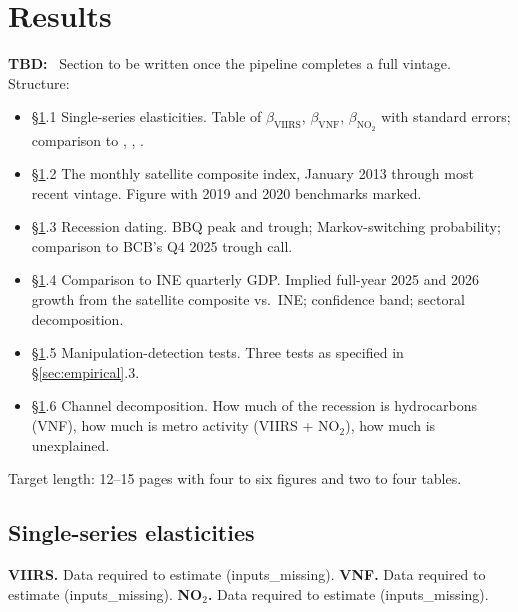 \documentclass[11pt,letterpaper]{article}
\newenvironment{tbd}{\begin{tbdbox}\noindent\textbf{\color{yellow!60!black}TBD:}\ }{\end{tbdbox}}
\newcommand{\claim}[1]{\textbf{#1.}}
\begin{document}
\section{Results}
\label{sec:results}

\begin{tbd}
Section to be written once the pipeline completes a full vintage. Structure:
\begin{itemize}[nosep]
\item \S\ref{sec:results}.1 Single-series elasticities. Table of $\beta_{\text{VIIRS}}$, $\beta_{\text{VNF}}$, $\beta_{\text{NO}_2}$ with standard errors; comparison to \citet{hsw2012}, \citet{beyer_hu_yao2022}, \citet{do_etal2018}.
\item \S\ref{sec:results}.2 The monthly satellite composite index, January \num{2013} through most recent vintage. Figure with \num{2019} and \num{2020} benchmarks marked.
\item \S\ref{sec:results}.3 Recession dating. BBQ peak and trough; Markov-switching probability; comparison to BCB's Q4 \num{2025} trough call.
\item \S\ref{sec:results}.4 Comparison to INE quarterly GDP. Implied full-year \num{2025} and \num{2026} growth from the satellite composite vs.\ INE; confidence band; sectoral decomposition.
\item \S\ref{sec:results}.5 Manipulation-detection tests. Three tests as specified in \S\ref{sec:empirical}.3.
\item \S\ref{sec:results}.6 Channel decomposition. How much of the recession is hydrocarbons (VNF), how much is metro activity (VIIRS + NO$_2$), how much is unexplained.
\end{itemize}
Target length: \numrange{12}{15} pages with four to six figures and two to four tables.
\end{tbd}

\subsection{Single-series elasticities}
\label{subsec:elasticities}


\claim{VIIRS} Data required to estimate (inputs_missing).
\claim{VNF} Data required to estimate (inputs_missing).
\claim{NO$_2$} Data required to estimate (inputs_missing).
\end{document}
